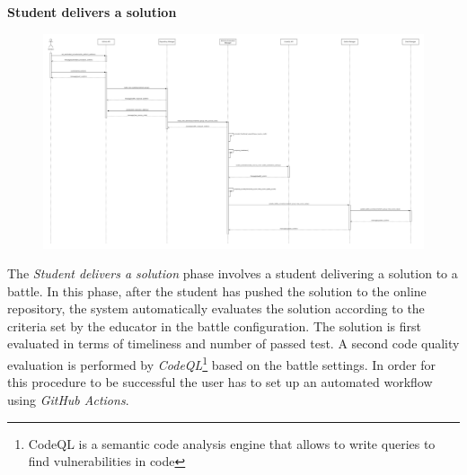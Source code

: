 \documentclass[../DD.tex]{subfiles}
\begin{document}
    \textbf{Student delivers a solution}\\
    \begin{figure}[H]
        \centering
        \hspace*{-3cm}
        \includegraphics[width=1.4\textwidth]{../assets/section_2/StudentDeliversASolution.png}
    \end{figure}
    The \textit{Student delivers a solution} phase involves a student delivering a solution to a battle.
    In this phase, after the student has pushed the solution to the online repository, the system automatically evaluates the solution according to the criteria set by the educator in the battle configuration.
    The solution is first evaluated in terms of timeliness and number of passed test.
    A second code quality evaluation is performed by \textit{CodeQL}\footnote{CodeQL is a semantic code analysis engine that allows to write queries to find vulnerabilities in code} based on the battle settings.
    In order for this procedure to be successful the user has to set up an automated workflow using \textit{GitHub Actions}.
    \newpage
\end{document}
